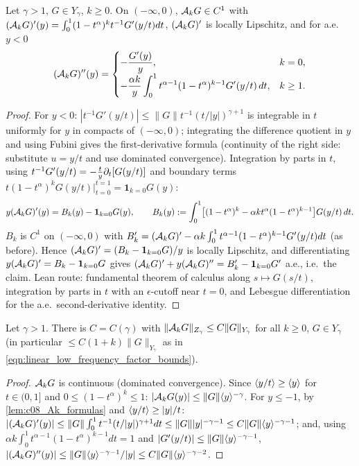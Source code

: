 \begin{lemma}
  \label{lem:c08_Ak_formulas}
  Let $\gamma>1$, $G\in Y_\gamma$, $k\ge0$. On $(-\infty,0)$, $\mathcal{A}_kG\in C^1$ with $(\mathcal{A}_kG)'(y)=\int_0^1(1-t^\alpha)^kt^{-1}G'(y/t)dt$,
  $(\mathcal{A}_kG)'$ is locally Lipschitz, and for a.e.\ $y<0$
  \[
    (\mathcal{A}_kG)''(y)=\begin{cases}-\dfrac{G'(y)}{y},&k=0,\\[4pt]-\dfrac{\alpha k}{y}\displaystyle\int_0^1t^{\alpha-1}(1-t^\alpha)^{k-1}G'(y/t)\,dt,&k\ge1.\end{cases}
  \]
\end{lemma}
\begin{proof}
  For $y<0$: $|t^{-1}G'(y/t)|\le\|G\|t^{-1}(t/|y|)^{\gamma+1}$ is integrable in $t$ uniformly for $y$ in compacts of
  $(-\infty,0)$; integrating the difference quotient in $y$ and using Fubini gives the first-derivative formula (continuity
  of the right side: substitute $u=y/t$ and use dominated convergence). Integration by parts in $t$, using
  $t^{-1}G'(y/t)=-\frac ty\partial_t[G(y/t)]$ and boundary terms $t(1-t^\alpha)^kG(y/t)|_{t=0}^{t=1}=\mathbf 1_{k=0}G(y)$:
  \[
    y(\mathcal{A}_kG)'(y)=B_k(y)-\mathbf 1_{k=0}G(y),\qquad B_k(y):=\int_0^1\bigl[(1-t^\alpha)^k-\alpha kt^\alpha(1-t^\alpha)^{k-1}\bigr]G(y/t)\,dt .
  \]
  $B_k$ is $C^1$ on $(-\infty,0)$ with $B_k'=(\mathcal{A}_kG)'-\alpha k\int_0^1t^{\alpha-1}(1-t^\alpha)^{k-1}G'(y/t)dt$ (as before). Hence
  $(\mathcal{A}_kG)'=(B_k-\mathbf 1_{k=0}G)/y$ is locally Lipschitz, and differentiating
  $y(\mathcal{A}_kG)'=B_k-\mathbf 1_{k=0}G$ gives $(\mathcal{A}_kG)'+y(\mathcal{A}_kG)''=B_k'-\mathbf 1_{k=0}G'$ a.e., i.e.\ the claim.
  Lean route: fundamental theorem of calculus along $s\mapsto G(s/t)$, integration by parts in $t$ with an $\epsilon$-cutoff near $t=0$, and Lebesgue differentiation for the a.e.\ second-derivative identity.
\end{proof}

\begin{lemma}
  \label{lem:c08_Ak_bound}
  Let $\gamma>1$. There is $C=C(\gamma)$ with $\|\mathcal{A}_kG\|_{Z_\gamma}\le C\|G\|_{Y_\gamma}$ for all $k\ge0$, $G\in Y_\gamma$ (in particular
  $\le C(1+k)\|G\|_{Y_\gamma}$ as in \eqref{eqn:linear_low_frequency_factor_bounds}).
\end{lemma}
\begin{proof}
  $\mathcal{A}_kG$ is continuous (dominated convergence). Since $\langle y/t \rangle\ge\langle y \rangle$ for $t\in(0,1]$ and $0\le(1-t^\alpha)^k\le1$:
  $|\mathcal{A}_kG(y)|\le\|G\|\langle y \rangle^{-\gamma}$. For $y\le-1$, by \cref{lem:c08_Ak_formulas} and $\langle y/t \rangle\ge|y|/t$:
  $|(\mathcal{A}_kG)'(y)|\le\|G\|\int_0^1t^{-1}(t/|y|)^{\gamma+1}dt\le\|G\||y|^{-\gamma-1}\le C\|G\|\langle y \rangle^{-\gamma-1}$; and, using
  $\alpha k\int_0^1t^{\alpha-1}(1-t^\alpha)^{k-1}dt=1$ and $|G'(y/t)|\le\|G\|\langle y \rangle^{-\gamma-1}$,
  $|(\mathcal{A}_kG)''(y)|\le\|G\|\langle y \rangle^{-\gamma-1}/|y|\le C\|G\|\langle y \rangle^{-\gamma-2}$.
\end{proof}

